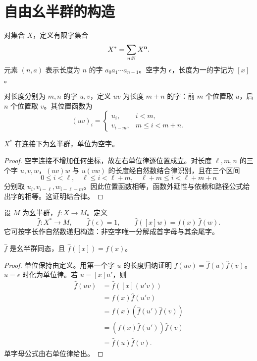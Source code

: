 \section{自由幺半群的构造}
\begin{definition}[有限字]
对集合 $X$，定义有限字集合
\[
X^*=\sum_{n:\mathbb N}X^{\mathbf n}.
\]
元素 $(n,a)$ 表示长度为 $n$ 的字 $a_0a_1\cdots a_{n-1}$。空字为 $\epsilon$，长度为一的字记为 $[x]$。
\end{definition}
\begin{definition}[连接]
对长度分别为 $m,n$ 的字 $u,v$，定义 $uv$ 为长度 $m+n$ 的字：前 $m$ 个位置取 $u$，后 $n$ 个位置取 $v$。其位置函数为
\[
(uv)_i=
\begin{cases}
u_i,&i<m,\\
v_{i-m},&m\le i<m+n.
\end{cases}
\]

\end{definition}
\begin{proposition}
$X^*$ 在连接下为幺半群，单位为空字。
\end{proposition}
\begin{proof}
空字连接不增加任何坐标，故左右单位律逐位置成立。对长度 $\ell,m,n$ 的三个字 $u,v,w$，$(uv)w$ 与 $u(vw)$ 的长度经自然数结合律识别，且在三个区间
\[
0\le i<\ell,\quad
\ell\le i<\ell+m,\quad
\ell+m\le i<\ell+m+n
\]
分别取 $u_i,v_{i-\ell},w_{i-\ell-m}$。因此位置函数相等，函数外延性与依赖和路径公式给出字的相等。这证明结合律。
\end{proof}
\begin{definition}[折叠映射]
设 $M$ 为幺半群，$f:X\to M$。定义
\[
\widehat f:X^*\to M,
\qquad
\widehat f(\epsilon)=1,
\qquad
\widehat f([x]w)=f(x)\,\widehat f(w).
\]
它可按字长作自然数递归构造：非空字唯一分解成首字母与其余尾字。
\end{definition}
\begin{proposition}
$\widehat f$ 是幺半群同态，且 $\widehat f([x])=f(x)$。
\end{proposition}
\begin{proof}
单位保持由定义。用第一个字 $u$ 的长度归纳证明
$\widehat f(uv)=\widehat f(u)\widehat f(v)$。$u=\epsilon$ 时化为单位律。若 $u=[x]u'$，则
\begin{align*}
\widehat f(uv)
&=\widehat f([x](u'v))\\
&=f(x)\widehat f(u'v)\\
&=f(x)(\widehat f(u')\widehat f(v))\\
&=(f(x)\widehat f(u'))\widehat f(v)\\
&=\widehat f(u)\widehat f(v).
\end{align*}
单字母公式由右单位律给出。
\end{proof}
